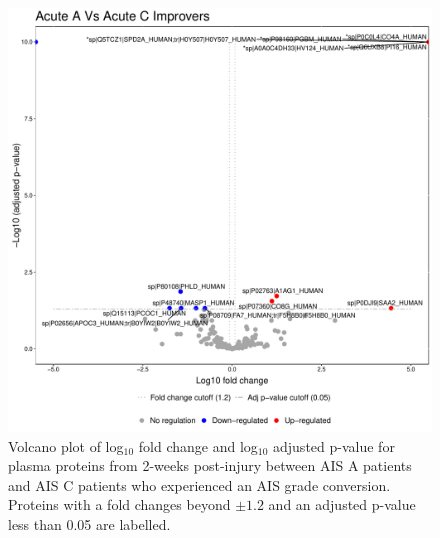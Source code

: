 \documentclass[9pt,lineno]{elife}
\begin{document}
\begin{landscape}
\begin{landscape}
\begin{landscape}
\begin{landscape}
\begin{figure}
\includegraphics[width=1\linewidth]{figures/openms_protein_quantification/label_free/volcano_plots/openms_volcano_plot_2021-08-10_0001} \caption{Volcano plot of log\(_10\) fold change and log\(_10\) adjusted p-value for plasma proteins from 2-weeks post-injury between AIS A patients and AIS C patients who experienced an AIS grade conversion. Proteins with a fold changes beyond \(\pm 1.2\) and an adjusted p-value less than 0.05 are labelled.}\label{fig:volc-plot-acute-a-vs-acute-c-imp}
\end{figure}




\end{landscape}
\end{landscape}
\end{landscape}
\end{landscape}
\end{document}
